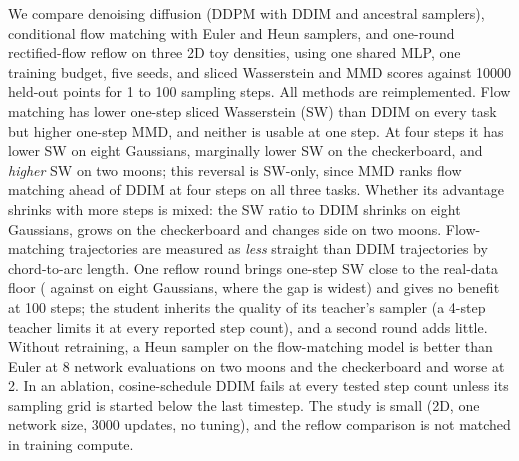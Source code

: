 We compare denoising diffusion (DDPM with DDIM and ancestral samplers), conditional flow matching with Euler and Heun samplers, and one-round rectified-flow reflow on three 2D toy densities, using one shared MLP, one training budget, five seeds, and sliced Wasserstein and MMD scores against 10000 held-out points for 1 to 100 sampling steps. All methods are reimplemented. Flow matching has lower one-step sliced Wasserstein (SW) than DDIM on every task but higher one-step MMD, and neither is usable at one step. At four steps it has lower SW on eight Gaussians, marginally lower SW on the checkerboard, and \emph{higher} SW on two moons; this reversal is SW-only, since MMD ranks flow matching ahead of DDIM at four steps on all three tasks. Whether its advantage shrinks with more steps is mixed: the SW ratio to DDIM shrinks on eight Gaussians, grows on the checkerboard and changes side on two moons. Flow-matching trajectories are measured as \emph{less} straight than DDIM trajectories by chord-to-arc length. One reflow round brings one-step SW close to the real-data floor ( against  on eight Gaussians, where the gap is widest) and gives no benefit at 100 steps; the student inherits the quality of its teacher's sampler (a 4-step teacher limits it at every reported step count), and a second round adds little. Without retraining, a Heun sampler on the flow-matching model is better than Euler at 8 network evaluations on two moons and the checkerboard and worse at 2. In an ablation, cosine-schedule DDIM fails at every tested step count unless its sampling grid is started below the last timestep. The study is small (2D, one network size, 3000 updates, no tuning), and the reflow comparison is not matched in training compute.
